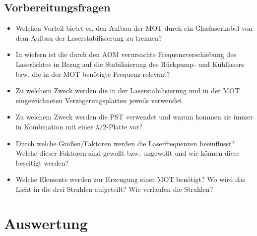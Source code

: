 \documentclass[10pt,a4paper]{extarticle}
\begin{document}
\subsection*{Vorbereitungsfragen}
\begin{itemize}
\item Welchen Vorteil bietet es, den Aufbau der MOT durch ein Glasfaserkabel von dem Aufbau der Laserstabilisierung zu trennen?
\item In wiefern ist die durch den AOM verursachte Frequenzverschiebung des Laserlichtes in Bezug auf die Stabilisierung des Rückpump- und Kühllasers bzw. die in der MOT benötigte Frequenz relevant?
\item Zu welchem Zweck werden die in der Laserstabilisierung und in der MOT eingezeichneten Verzögerungsplatten jeweils verwendet
\item Zu welchem Zweck werden die PST verwendet und warum kommen sie immer in Kombination mit einer $\lambda/2$-Platte vor?
\item Durch welche Größen/Faktoren werden die Laserfrequenzen beeinflusst? Welche dieser Faktoren sind gewollt bzw. ungewollt und wie können diese beseitigt werden?
\item Welche Elemente werden zur Erzeugung einer MOT benötigt? Wo wird das Licht in die drei Strahlen aufgeteilt? Wie verlaufen die Strahlen?
\end{itemize}

\newpage
\section{Auswertung}
\end{document}
